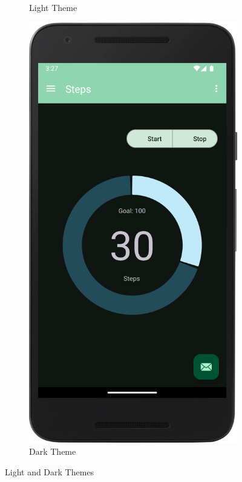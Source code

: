 \documentclass{usireport}
\begin{document}
\begin{figure}[H]
\begin{subfigure}[b]{0.3\textwidth}
        \caption{Light Theme}
    \end{subfigure}
    \hspace{2cm}
    \begin{subfigure}[b]{0.3\textwidth}
        \includegraphics[width=\textwidth]{fig/dark_mode.png}
        \caption{Dark Theme}
    \end{subfigure}
    \caption{Light and Dark Themes}
    \label{fig:themes}
\end{figure}
\end{document}
